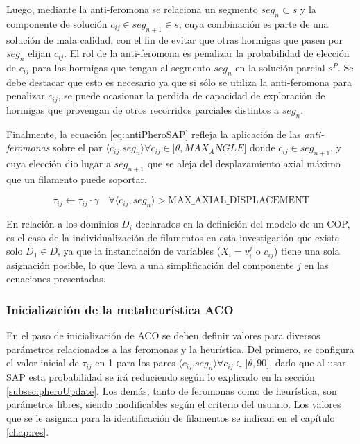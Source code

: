 Luego, mediante la anti-feromona se relaciona un segmento $seg_n \subset s$ y la componente de soluci\'on $c_{ij} \in seg_{n+1} \in s$, cuya combinaci\'on es parte de una soluci\'on de mala calidad, con el fin de evitar que otras hormigas que pasen por $seg_n$ elijan $c_{ij}$. El rol de la anti-feromona es penalizar la probabilidad de elecci\'on de $c_{ij}$ para las hormigas que tengan al segmento $seg_n$ en la soluci\'on parcial $s^{P}$. Se debe destacar que esto es necesario ya que si s\'olo se utiliza la anti-feromona para penalizar $c_{ij}$, se puede ocasionar la perdida de capacidad de exploraci\'on de hormigas que provengan de otros recorridos parciales distintos a $seg_n$. 




Finalmente, la ecuaci\'on \eqref{eq:antiPheroSAP} refleja la aplicaci\'on de las {\it anti-feromonas} sobre el par $\langle c_{ij}$,$ seg_{n}\rangle \forall c_{ij} \in ]\theta, MAX_ANGLE]$  donde $c_{ij} \in seg_{n+1}$, y cuya elecci\'on dio lugar a $seg_{n+1}$ que se aleja del desplazamiento axial m\'aximo que un filamento puede soportar.

\begin{equation}
    \label{eq:antiPheroSAP}
    \tau_{ij} \leftarrow \tau_{ij} \cdot \gamma \quad \forall \langle c_{ij},seg_{n}\rangle > \textrm{MAX\_AXIAL\_DISPLACEMENT}
\end{equation}

En relaci\'on a los dominios $D_i$ declarados en la definici\'on del modelo de un COP, es el caso de la individualizaci\'on de filamentos en esta investigaci\'on que existe solo $D_1 \in D$, ya que la instanciaci\'on de variables ($X_i = v_{i}^{j}$ o $c_{ij}$) tiene una sola asignaci\'on posible, lo que lleva a una simplificaci\'on del componente $j$ en las ecuaciones presentadas.

\subsubsection{Inicializaci\'on de la metaheur\'istica ACO}

En el paso de inicializaci\'on de ACO se deben definir valores para diversos par\'ametros relacionados a las feromonas y la heur\'istica. Del primero, se configura el valor inicial de $\tau_{ij}$ en 1 para los pares $\langle c_{ij}$,$ seg_{n}\rangle \forall c_{ij} \in ]\theta, 90]$, dado que al usar SAP esta probabilidad se ir\'a reduciendo seg\'un lo explicado en la secci\'on \ref{subsec:pheroUpdate}. Los dem\'as, tanto de feromonas como de heur\'istica, son par\'ametros libres, siendo modificables seg\'un el criterio del usuario. Los valores que se le asignan para la identificaci\'on de filamentos se indican en el cap\'itulo \ref{chap:res}.

